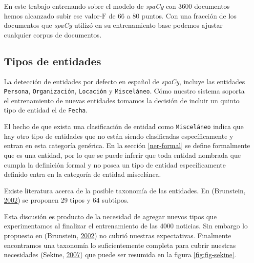 \documentclass[12pt,a4paper,]{scrartcl}
\begin{document}
En este trabajo entrenando sobre el modelo de \emph{spaCy} con 3600 documentos hemos alcanzado subir ese \(\text{valor-F}\) de 66 a 80 puntos. Con una fracción de los documentos que \emph{spaCy} utilizó en su entrenamiento base podemos ajustar cualquier corpus de documentos.

\hypertarget{tipos-de-entidades}{%
\subsection{Tipos de entidades}\label{tipos-de-entidades}}

La detección de entidades por defecto en español de \emph{spaCy}, incluye las entidades \texttt{Persona}, \texttt{Organización}, \texttt{Locación} y \texttt{Misceláneo}. Cómo nuestro sistema soporta el entrenamiento de nuevas entidades tomamos la decisión de incluir un quinto tipo de entidad el de \texttt{Fecha}.

El hecho de que exista una clasificación de entidad como \texttt{Misceláneo} indica que hay otro tipo de entidades que no están siendo clasificadas específicamente y entran en esta categoría genérica. En la sección \ref{ner-formal} se define formalmente que es una entidad, por lo que se puede inferir que toda entidad nombrada que cumpla la definición formal y no posea un tipo de entidad específicamente definido entra en la categoría de entidad miscelánea.

Existe literatura acerca de la posible taxonomía de las entidades. En (Brunstein, \protect\hyperlink{ref-brunstein2002}{2002}) se proponen 29 tipos y 64 subtipos.

Esta discusión es producto de la necesidad de agregar nuevos tipos que experimentamos al finalizar el entrenamiento de las 4000 noticias. Sin embargo lo propuesto en (Brunstein, \protect\hyperlink{ref-brunstein2002}{2002}) no cubrió nuestras expectativas. Finalmente encontramos una taxonomía lo suficientemente completa para cubrir nuestras necesidades (Sekine, \protect\hyperlink{ref-Sekine-NER}{2007}) que puede ser resumida en la figura \ref{fig:fig-sekine}.
\end{document}
